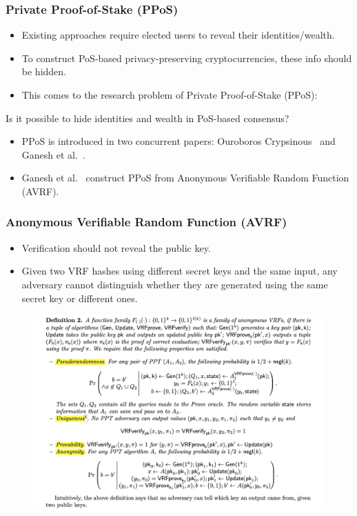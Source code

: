 \documentclass{beamer}
\begin{document}
\begin{frame}
\frametitle{Private Proof-of-Stake (PPoS)}

\begin{itemize}
    \item Existing approaches require elected users to reveal their identities/wealth.
    \item To construct PoS-based privacy-preserving cryptocurrencies, these info should be hidden.
    \item This comes to the research problem of Private Proof-of-Stake (PPoS):
\end{itemize}

\centerline{\color{red} Is it possible to hide identities and wealth in PoS-based consensus?}

\begin{itemize}
    \item PPoS is introduced in two concurrent papers: Ouroboros Crypsinous~\cite{kerber2019ouroboros} and Ganesh et al.~\cite{ganesh2019proof}.
    \item Ganesh et al.~\cite{ganesh2019proof} construct PPoS from Anonymous Verifiable Random Function (AVRF).
\end{itemize}

\end{frame}


\begin{frame}
\frametitle{Anonymous Verifiable Random Function (AVRF)}
    
\begin{itemize}
    \item Verification should not reveal the public key.
    \item Given two VRF hashes using different secret keys and the same input, any adversary cannot distinguish whether they are generated using the same secret key or different ones.
\end{itemize}

\begin{figure}
    \centering
    \includegraphics[width=.7\textwidth]{figs/avrf-def.png}
\end{figure}


\end{frame}
\end{document}
